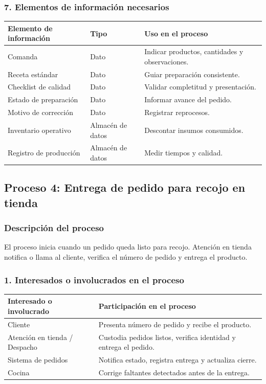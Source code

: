 \documentclass[a4paper,12pt]{article}
\begin{document}
\subsubsection*{7. Elementos de información necesarios}

\begin{longtable}{P{5cm} P{5cm} P{4cm}}
\toprule
\textbf{Elemento de información} & \textbf{Tipo} & \textbf{Uso en el proceso} \\
\midrule
Comanda & Dato & Indicar productos, cantidades y observaciones. \\
Receta estándar & Dato & Guiar preparación consistente. \\
Checklist de calidad & Dato & Validar completitud y presentación. \\
Estado de preparación & Dato & Informar avance del pedido. \\
Motivo de corrección & Dato & Registrar reprocesos. \\
Inventario operativo & Almacén de datos & Descontar insumos consumidos. \\
Registro de producción & Almacén de datos & Medir tiempos y calidad. \\
\bottomrule
\end{longtable}

\subsection*{Proceso 4: Entrega de pedido para recojo en tienda}

\subsubsection*{Descripción del proceso}

El proceso inicia cuando un pedido queda listo para recojo. Atención en tienda notifica o llama al cliente, verifica el número de pedido y entrega el producto.

\subsubsection*{1. Interesados o involucrados en el proceso}

\begin{longtable}{P{5cm} P{9cm}}
\toprule
\textbf{Interesado o involucrado} & \textbf{Participación en el proceso} \\
\midrule
Cliente & Presenta número de pedido y recibe el producto. \\
Atención en tienda / Despacho & Custodia pedidos listos, verifica identidad y entrega el pedido. \\
Sistema de pedidos & Notifica estado, registra entrega y actualiza cierre. \\
Cocina & Corrige faltantes detectados antes de la entrega. \\
\bottomrule
\end{longtable}
\end{document}
